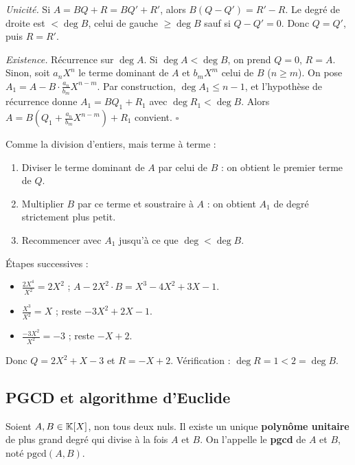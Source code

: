 \begin{proofbox}
\textit{Unicité.} Si $A = BQ + R = BQ' + R'$, alors $B(Q - Q') = R' - R$. Le degré de droite est $< \deg B$, celui de gauche $\geqslant \deg B$ sauf si $Q - Q' = 0$. Donc $Q = Q'$, puis $R = R'$.

\textit{Existence.} Récurrence sur $\deg A$. Si $\deg A < \deg B$, on prend $Q = 0$, $R = A$. Sinon, soit $a_n X^n$ le terme dominant de $A$ et $b_m X^m$ celui de $B$ ($n \geqslant m$). On pose $A_1 = A - B \cdot \frac{a_n}{b_m} X^{n-m}$. Par construction, $\deg A_1 \leqslant n - 1$, et l'hypothèse de récurrence donne $A_1 = B Q_1 + R_1$ avec $\deg R_1 < \deg B$. Alors $A = B(Q_1 + \frac{a_n}{b_m} X^{n-m}) + R_1$ convient. \hfill$\square$
\end{proofbox}

\begin{methodbox}
Comme la division d'entiers, mais terme à terme :
\begin{enumerate}[leftmargin=1.5cm]
  \item Diviser le terme dominant de $A$ par celui de $B$ : on obtient le premier terme de $Q$.
  \item Multiplier $B$ par ce terme et soustraire à $A$ : on obtient $A_1$ de degré strictement plus petit.
  \item Recommencer avec $A_1$ jusqu'à ce que $\deg < \deg B$.
\end{enumerate}
\end{methodbox}

\begin{exbox}[$A = 2X^4 - X^3 - 2X^2 + 3X - 1$, $B = X^2 - X + 1$]
Étapes successives :
\begin{itemize}[leftmargin=1cm]
  \item $\frac{2X^4}{X^2} = 2X^2$ ; $A - 2X^2 \cdot B = X^3 - 4X^2 + 3X - 1$.
  \item $\frac{X^3}{X^2} = X$ ; reste $-3X^2 + 2X - 1$.
  \item $\frac{-3X^2}{X^2} = -3$ ; reste $-X + 2$.
\end{itemize}
Donc $Q = 2X^2 + X - 3$ et $R = -X + 2$. Vérification : $\deg R = 1 < 2 = \deg B$. \checkmark
\end{exbox}

\subsection{PGCD et algorithme d'Euclide}

\begin{propbox}
Soient $A, B \in \mathbb{K}[X]$, non tous deux nuls. Il existe un unique \textbf{polynôme unitaire} de plus grand degré qui divise à la fois $A$ et $B$. On l'appelle le \textbf{pgcd} de $A$ et $B$, noté $\text{pgcd}(A, B)$.
\end{propbox}

